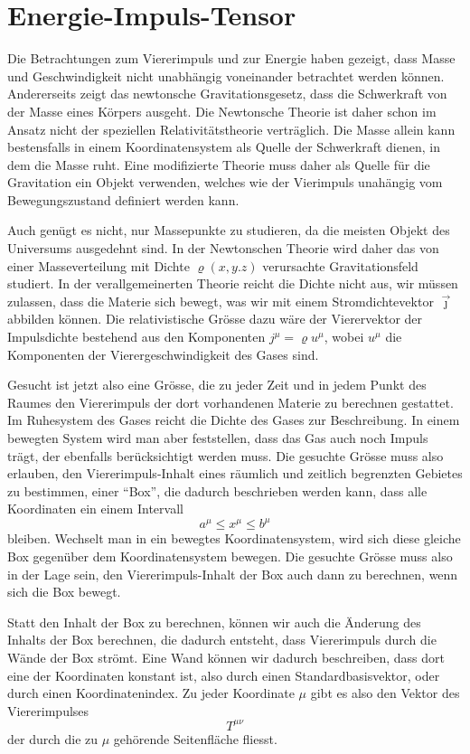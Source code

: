 \section{Energie-Impuls-Tensor}
Die Betrachtungen zum Viererimpuls und zur Energie haben gezeigt, dass
Masse und Geschwindigkeit nicht unabhängig voneinander betrachtet
werden können.
Andererseits zeigt das newtonsche Gravitationsgesetz, dass die Schwerkraft
von der Masse eines Körpers ausgeht.
Die Newtonsche Theorie ist daher schon im Ansatz nicht der
speziellen Relativitätstheorie verträglich.
Die Masse allein kann bestensfalls in einem Koordinatensystem als
Quelle der Schwerkraft dienen, in dem die Masse ruht.
Eine modifizierte Theorie muss daher als Quelle für die Gravitation
ein Objekt verwenden, welches wie der Vierimpuls unahängig vom
Bewegungszustand definiert werden kann.

Auch genügt es nicht, nur Massepunkte zu studieren, da die meisten
Objekt des Universums ausgedehnt sind.
In der Newtonschen Theorie wird daher das von einer Masseverteilung mit
Dichte $\varrho(x,y.z)$ verursachte Gravitationsfeld studiert.
In der verallgemeinerten Theorie reicht die Dichte nicht aus,
wir müssen zulassen, dass die Materie sich bewegt, was wir mit einem
Stromdichtevektor $\vec\jmath$ abbilden können.
Die relativistische Grösse dazu wäre der Vierervektor der Impulsdichte
bestehend aus den Komponenten $j^\mu=\varrho u^\mu$,
wobei $u^\mu$ die Komponenten der Vierergeschwindigkeit des Gases sind.

Gesucht ist jetzt also eine Grösse, die zu jeder Zeit und in jedem
Punkt des Raumes den Viererimpuls der dort vorhandenen Materie zu
berechnen gestattet.
Im Ruhesystem des Gases reicht die Dichte des Gases zur Beschreibung.
In einem bewegten System wird man aber feststellen, dass das Gas auch
noch Impuls trägt, der ebenfalls berücksichtigt werden muss.
Die gesuchte Grösse muss also erlauben, den Viererimpuls-Inhalt eines
räumlich und zeitlich begrenzten Gebietes zu bestimmen, einer ``Box'', 
die dadurch beschrieben werden kann, dass alle Koordinaten ein einem
Intervall
\[
a^\mu \le x^\mu \le b^\mu
\]
bleiben.
Wechselt man in ein bewegtes Koordinatensystem, wird sich diese
gleiche Box gegenüber dem Koordinatensystem bewegen.
Die gesuchte Grösse muss also in der Lage sein, den Viererimpuls-Inhalt
der Box auch dann zu berechnen, wenn sich die Box bewegt.

Statt den Inhalt der Box zu berechnen, können wir auch die Änderung des
Inhalts der Box berechnen, die dadurch entsteht, dass Viererimpuls durch
die Wände der Box strömt.
Eine Wand können wir dadurch beschreiben, dass dort eine der Koordinaten
konstant ist, also durch einen Standardbasisvektor, oder durch einen
Koordinatenindex.
Zu jeder Koordinate $\mu$ gibt es also den Vektor des Viererimpulses
\[
T^{\mu\nu}
\]
der durch die zu $\mu$ gehörende Seitenfläche fliesst.

